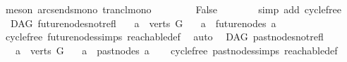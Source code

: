 \begin{isabellebody}
\ {\isacharparenleft}{\kern0pt}meson\ arcs{\isacharunderscore}{\kern0pt}ends{\isacharunderscore}{\kern0pt}mono\ trancl{\isacharunderscore}{\kern0pt}mono{\isacharparenright}{\kern0pt}\ \isanewline
\ \ \ \ \isamarkupfalse%
\ \isamarkupfalse%
\ False\isanewline
\ \ \ \ \ \ \isamarkupfalse%
\ {\isacharparenleft}{\kern0pt}simp\ add{\isacharcolon}{\kern0pt}\ cycle{\isacharunderscore}{\kern0pt}free{\isacharparenright}{\kern0pt}\isanewline
\ \ \isamarkupfalse%
%
\endisatagproof
{\isafoldproof}%
%
\isadelimproof
%
\endisadelimproof
%
\isadelimdocument
%
\endisadelimdocument
%
\isatagdocument
%
\isamarkuptrue%
%
\endisatagdocument
{\isafolddocument}%
%
\isadelimdocument
%
\endisadelimdocument
{}\isamarkupfalse%
\ {\isacharparenleft}{\kern0pt}\ DAG{\isacharparenright}{\kern0pt}\ future{\isacharunderscore}{\kern0pt}nodes{\isacharunderscore}{\kern0pt}not{\isacharunderscore}{\kern0pt}refl{\isacharcolon}{\kern0pt}\isanewline
\ \ \ {\isachardoublequoteopen}a\ {\isasymin}\ verts\ G{\isachardoublequoteclose}\isanewline
\ \ \ {\isachardoublequoteopen}a\ {\isasymnotin}\ future{\isacharunderscore}{\kern0pt}nodes\ a{\isachardoublequoteclose}\isanewline
%
\isadelimproof
\ \ %
\endisadelimproof
%
\isatagproof
{}\isamarkupfalse%
\ cycle{\isacharunderscore}{\kern0pt}free\ future{\isacharunderscore}{\kern0pt}nodes{\isachardot}{\kern0pt}simps\ reachable{\isacharunderscore}{\kern0pt}def\ \isamarkupfalse%
\ auto%
\endisatagproof
{\isafoldproof}%
%
\isadelimproof
%
\endisadelimproof
%
\isadelimdocument
%
\endisadelimdocument
%
\isatagdocument
%
\isamarkuptrue%
%
\endisatagdocument
{\isafolddocument}%
%
\isadelimdocument
%
\endisadelimdocument
{}\isamarkupfalse%
\ {\isacharparenleft}{\kern0pt}\ DAG{\isacharparenright}{\kern0pt}\ past{\isacharunderscore}{\kern0pt}nodes{\isacharunderscore}{\kern0pt}not{\isacharunderscore}{\kern0pt}refl{\isacharcolon}{\kern0pt}\isanewline
\ \ \ {\isachardoublequoteopen}a\ {\isasymin}\ verts\ G{\isachardoublequoteclose}\isanewline
\ \ \ {\isachardoublequoteopen}a\ {\isasymnotin}\ past{\isacharunderscore}{\kern0pt}nodes\ a{\isachardoublequoteclose}\isanewline
%
\isadelimproof
\ \ %
\endisadelimproof
%
\isatagproof
{}\isamarkupfalse%
\ cycle{\isacharunderscore}{\kern0pt}free\ past{\isacharunderscore}{\kern0pt}nodes{\isachardot}{\kern0pt}simps\ reachable{\isacharunderscore}{\kern0pt}def\ \isamarkupfalse%

\end{isabellebody}
